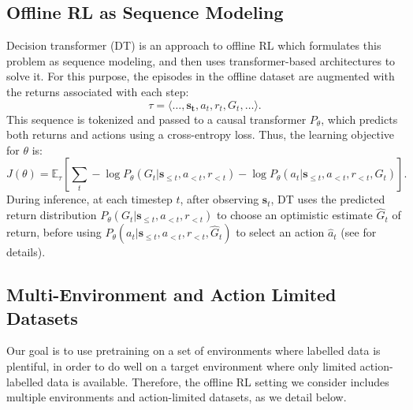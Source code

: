 \documentclass{article} %
\begin{document}
\subsection{Offline RL as Sequence Modeling}
\label{seqmodel}
Decision transformer (DT) \citep{https://doi.org/10.48550/arxiv.2106.01345} is an  approach to  offline RL which formulates this problem as sequence modeling, and then uses transformer-based architectures to solve it. For this purpose, the episodes in the offline dataset are augmented with the returns associated with each step:
\begin{equation}
    \tau = \langle \dots, \mathbf{s_t}, a_t, r_t, G_t,  \dots \rangle.
\end{equation}
This sequence is tokenized  and passed to a causal transformer $P_\theta$, which predicts both returns and actions using a cross-entropy loss.
Thus, the learning objective for $\theta$ is:
\begin{equation}
\label{dtloss}
    J(\theta) = \mathbb{E}_{\tau} \left[\sum_{t} -\log P_\theta(G_t | \mathbf{s}_{\le t},a_{<t},r_{<t}) - \log P_\theta(a_t | \mathbf{s}_{\le t},a_{<t},r_{<t},G_{t}) \right].    
\end{equation}
During inference, at each timestep $t$, after observing $\mathbf{s}_t$, DT uses the predicted return distribution $P_\theta(G_t | \mathbf{s}_{\le t},a_{<t},r_{<t})$ to choose an optimistic estimate $\hat{G}_{t}$ of return, before using $P_\theta(a_t | \mathbf{s}_{\le t},a_{<t},r_{<t},\hat{G}_{t})$ to select an action $\hat{a}_t$ (see \citet{https://doi.org/10.48550/arxiv.2205.15241} for details).

\subsection{Multi-Environment and Action Limited Datasets}
\label{mtl}
Our goal is to use pretraining on a set of environments where labelled data is plentiful, in order to do well on a target environment where only limited action-labelled data is available. Therefore, the offline RL setting we consider includes multiple environments and action-limited datasets, as we detail below. 
\end{document}
